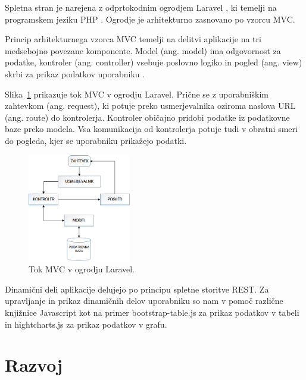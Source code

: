 \documentclass[a4paper, 12pt]{book}
\begin{document}
Spletna stran je narejena z odprtokodnim ogrodjem Laravel \cite{laravel-main-page}, ki temelji na programskem jeziku PHP \cite{php-jezik}. Ogrodje je arhitekturno zasnovano po vzorcu MVC. 

Princip arhitekturnega vzorca MVC temelji na delitvi aplikacije na tri medsebojno povezane komponente. Model (ang. model) ima odgovornost za podatke, kontroler (ang. controller) vsebuje poslovno logiko in pogled (ang. view) skrbi za prikaz podatkov uporabniku \cite{poglavje_laravel_mvc}.

Slika~\ref{mvc-laravel} prikazuje tok MVC v ogrodju Laravel. Prične se z uporabniškim zahtevkom (ang. request), ki potuje preko usmerjevalnika oziroma naslova URL (ang. route) do kontrolerja. Kontroler običajno pridobi podatke iz podatkovne baze preko modela. Vsa komunikacija od kontrolerja potuje tudi v obratni smeri do pogleda, kjer se uporabniku prikažejo podatki. 

\begin{figure}[h]
\begin{center}
\includegraphics[width=0.4\textwidth]{slike/Laravel-MVC.png}
\end{center}
\caption{Tok MVC v ogrodju Laravel.}
\label{mvc-laravel}
\end{figure}

\clearpage

Dinamični deli aplikacije delujejo po principu spletne storitve REST. Za upravljanje in prikaz dinamičnih delov uporabniku so nam v pomoč različne knjižnice Javascript kot na primer bootstrap-table.js \cite{bootstraptable} za prikaz podatkov v tabeli in hightcharts.js \cite{hightchars-js} za prikaz podatkov v grafu.






\chapter{Razvoj}
\label{razvoj}
\end{document}
